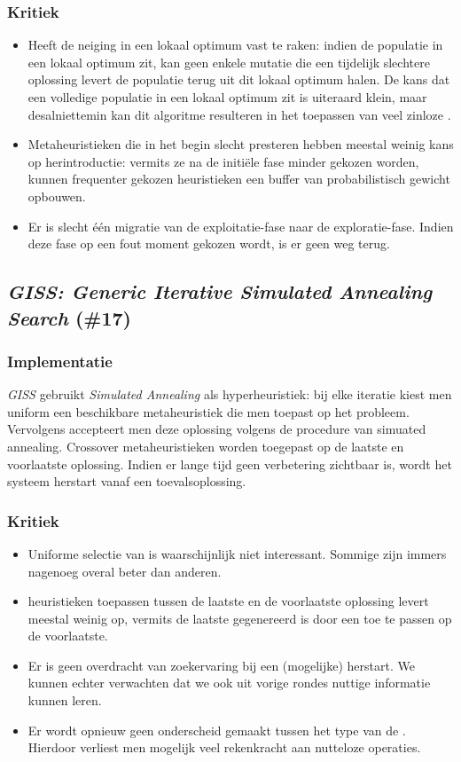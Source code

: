 \subsubsection{Kritiek}
\begin{itemize}
 \item Heeft de neiging in een lokaal optimum vast te raken: indien de populatie in een lokaal optimum zit, kan geen enkele mutatie die een tijdelijk slechtere oplossing levert de populatie terug uit dit lokaal optimum halen. De kans dat een volledige populatie in een lokaal optimum zit is uiteraard klein, maar desalniettemin kan dit algoritme resulteren in het toepassen van veel zinloze \abllh{}.
 \item Metaheuristieken die in het begin slecht presteren hebben meestal weinig kans op herintroductie: vermits ze na de initi\"ele fase minder gekozen worden, kunnen frequenter gekozen heuristieken een buffer van probabilistisch gewicht opbouwen.
 \item Er is slecht \'e\'en migratie van de exploitatie-fase naar de exploratie-fase. Indien deze fase op een fout moment gekozen wordt, is er geen weg terug.
\end{itemize}
\subsection{\emph{GISS: Generic Iterative Simulated Annealing Search} (\#17)}
\label{sss:giss}
\subsubsection{Implementatie}
\emph{GISS}\cite{chesc-giss} gebruikt \emph{Simulated Annealing}\cite{citeulike:1612433} als hyperheuristiek: bij elke iteratie kiest men uniform een beschikbare metaheuristiek die men toepast op het probleem. Vervolgens accepteert men deze oplossing volgens de procedure van simuated annealing. Crossover metaheuristieken worden toegepast op de laatste en voorlaatste oplossing. Indien er lange tijd geen verbetering zichtbaar is, wordt het systeem herstart vanaf een toevalsoplossing.
\subsubsection{Kritiek}
\begin{itemize}
 \item Uniforme selectie van \abllhn{} is waarschijnlijk niet interessant. Sommige \abllhn{} zijn immers nagenoeg overal beter dan anderen.
 \item \abco{} heuristieken toepassen tussen de laatste en de voorlaatste oplossing levert meestal weinig op, vermits de laatste gegenereerd is door een \abllh{} toe te passen op de voorlaatste.
 \item Er is geen overdracht van zoekervaring bij een (mogelijke) herstart. We kunnen echter verwachten dat we ook uit vorige rondes nuttige informatie kunnen leren.
 \item Er wordt opnieuw geen onderscheid gemaakt tussen het type van de \abllhn{}. Hierdoor verliest men mogelijk veel rekenkracht aan nutteloze operaties.
\end{itemize}
